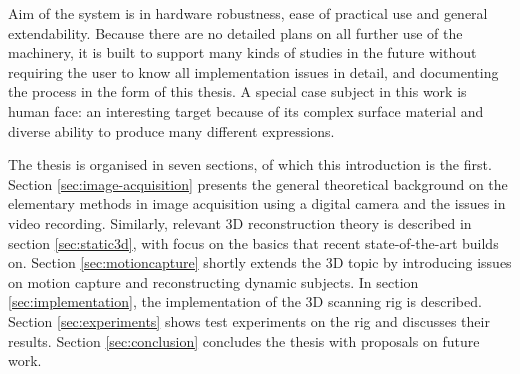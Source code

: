 Aim of the system is in hardware robustness, ease of practical use and general extendability.
Because there are no detailed plans on all further use of the machinery, it is built to support many kinds of studies in the future without requiring the user to know all implementation issues in detail, and documenting the process in the form of this thesis.
A special case subject in this work is human face: an interesting target because of its complex surface material and diverse ability to produce many different expressions.

The thesis is organised in seven sections, of which this introduction is the first.
Section \ref{sec:image-acquisition} presents the general theoretical background on the elementary methods in image acquisition using a digital camera and the issues in video recording.
Similarly, relevant 3D reconstruction theory is described in section \ref{sec:static3d}, with focus on the basics that recent state-of-the-art builds on.
Section \ref{sec:motioncapture} shortly extends the 3D topic by introducing issues on motion capture and reconstructing dynamic subjects.
In section \ref{sec:implementation}, the implementation of the 3D scanning rig is described.
Section \ref{sec:experiments} shows test experiments on the rig and discusses their results.
Section \ref{sec:conclusion} concludes the thesis with proposals on future work.
